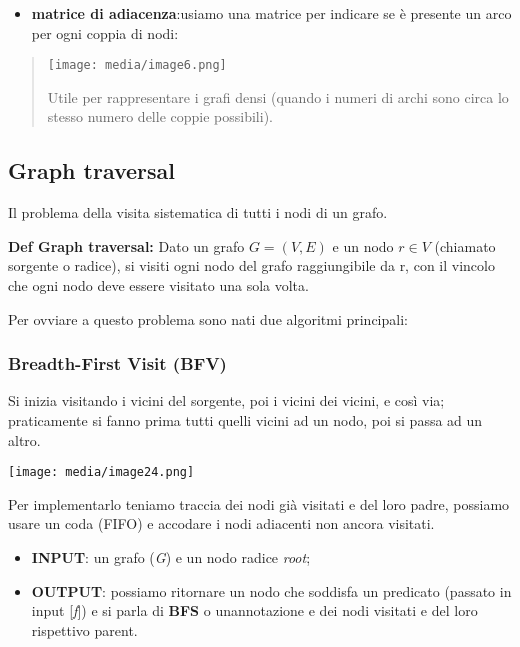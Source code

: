\begin{itemize}
\item
  \textbf{matrice di adiacenza}:usiamo una matrice per indicare se è
  presente un arco per ogni coppia di nodi:
\end{itemize}

\begin{quote}
\texttt{[image: media/image6.png]}

Utile per rappresentare i grafi densi (quando i numeri di archi sono
circa lo stesso numero delle coppie possibili).
\end{quote}

\subsection{Graph traversal}\label{graph-traversal}

Il problema della visita sistematica di tutti i nodi di un grafo.

\textbf{Def \textbar{} Graph traversal:} Dato un grafo \(G = (V,E)\) e
un nodo \(r \in V\) (chiamato sorgente o radice), si visiti ogni nodo
del grafo raggiungibile da r, con il vincolo che ogni nodo deve essere
visitato una sola volta.

Per ovviare a questo problema sono nati due algoritmi principali:

\subsubsection{Breadth-First Visit (BFV)}\label{breadth-first-visit-bfv}

Si inizia visitando i vicini del sorgente, poi i vicini dei vicini, e
così via; praticamente si fanno prima tutti quelli vicini ad un nodo,
poi si passa ad un altro.

\texttt{[image: media/image24.png]}

Per implementarlo teniamo traccia dei nodi già visitati e del loro
padre, possiamo usare un coda (FIFO) e accodare i nodi adiacenti non
ancora visitati.

\begin{itemize}
\item
  \textbf{INPUT}: un grafo (\emph{G}) e un nodo radice \emph{root};
\item
  \textbf{OUTPUT}: possiamo ritornare un nodo che soddisfa un predicato
  (passato in input {[}\emph{f}{]}) e si parla di \textbf{BFS} o
  un\textquotesingle annotazione e dei nodi visitati e del loro
  rispettivo parent.
\end{itemize}

